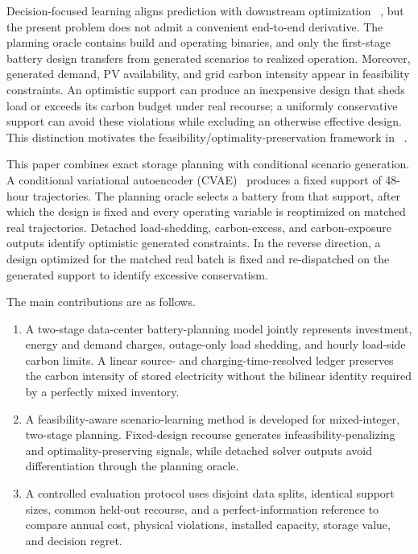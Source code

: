 \documentclass[times]{elsarticle}
\begin{document}
Decision-focused learning aligns prediction with downstream optimization
~\cite{Wilder2019}, but the present problem does not admit a convenient
end-to-end derivative. The planning oracle contains build and operating
binaries, and only the first-stage battery design transfers from generated
scenarios to realized operation. Moreover, generated demand, PV availability,
and grid carbon intensity appear in feasibility constraints. An optimistic
support can produce an inexpensive design that sheds load or exceeds its carbon
budget under real recourse; a uniformly conservative support can avoid these
violations while excluding an otherwise effective design. This distinction
motivates the feasibility/optimality-preservation framework in
~\cite{Mandi2025}.

This paper combines exact storage planning with conditional scenario
generation. A conditional variational autoencoder (CVAE)~\cite{Sohn2015}
produces a fixed support of 48-hour trajectories. The planning oracle selects a
battery from that support, after which the design is fixed and every operating
variable is reoptimized on matched real trajectories. Detached load-shedding,
carbon-excess, and carbon-exposure outputs identify optimistic generated
constraints. In the reverse direction, a design optimized for the matched real
batch is fixed and re-dispatched on the generated support to identify excessive
conservatism.

The main contributions are as follows.
\begin{enumerate}[leftmargin=*,label=\arabic*.]
\item A two-stage data-center battery-planning model jointly represents
investment, energy and demand charges, outage-only load shedding, and hourly
load-side carbon limits. A linear source- and charging-time-resolved ledger
preserves the carbon intensity of stored electricity without the bilinear
identity required by a perfectly mixed inventory.
\item A feasibility-aware scenario-learning method is developed for
mixed-integer, two-stage planning. Fixed-design recourse generates
infeasibility-penalizing and optimality-preserving signals, while detached
solver outputs avoid differentiation through the planning oracle.
\item A controlled evaluation protocol uses disjoint data splits, identical
support sizes, common held-out recourse, and a perfect-information reference to
compare annual cost, physical violations, installed capacity, storage value,
and decision regret.
\end{enumerate}
\end{document}
